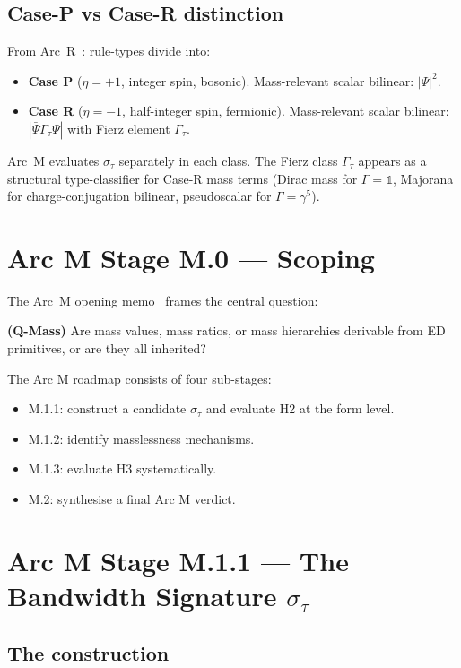 \documentclass[11pt,a4paper]{article}
\begin{document}
\subsection{Case-P vs Case-R distinction}

From Arc~R~\cite{arcr}: rule-types divide into:
\begin{itemize}
  \item \textbf{Case P} ($\eta = +1$, integer spin, bosonic). Mass-relevant scalar bilinear: $|\Psi|^2$.
  \item \textbf{Case R} ($\eta = -1$, half-integer spin, fermionic). Mass-relevant scalar bilinear: $|\bar\Psi \Gamma_\tau \Psi|$ with Fierz element $\Gamma_\tau$.
\end{itemize}
Arc~M evaluates $\sigma_\tau$ separately in each class. The Fierz class $\Gamma_\tau$ appears as a structural type-classifier for Case-R mass terms (Dirac mass for $\Gamma = \mathbb{1}$, Majorana for charge-conjugation bilinear, pseudoscalar for $\Gamma = \gamma^5$).

\section{Arc M Stage M.0 --- Scoping}

The Arc~M opening memo~\cite{m0scope} frames the central question:

\textbf{(Q-Mass)} Are mass values, mass ratios, or mass hierarchies derivable from ED primitives, or are they all inherited?

The Arc M roadmap consists of four sub-stages:
\begin{itemize}
  \item M.1.1: construct a candidate $\sigma_\tau$ and evaluate H2 at the form level.
  \item M.1.2: identify masslessness mechanisms.
  \item M.1.3: evaluate H3 systematically.
  \item M.2: synthesise a final Arc M verdict.
\end{itemize}

\section{Arc M Stage M.1.1 --- The Bandwidth Signature $\sigma_\tau$}
\label{sec:sigma}

\subsection{The construction}
\end{document}
